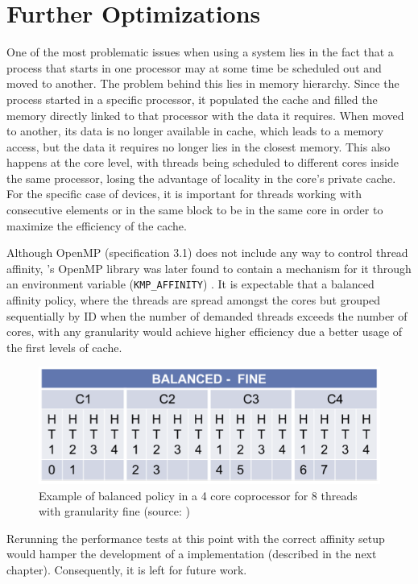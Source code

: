 \documentclass[../thesis]{subfiles}
\begin{document}
	\section{Further Optimizations}
	\label{sec:mic:further}

	One of the most problematic issues when using a \numa system lies in the fact that a process that starts in one processor may at some time be scheduled out and moved to another. The problem behind this lies in memory hierarchy. Since the process started in a specific processor, it populated the cache and filled the memory directly linked to that processor with the data it requires. When moved to another, its data is no longer available in cache, which leads to a memory access, but the data it requires no longer lies in the closest memory. This also happens at the core level, with threads being scheduled to different cores inside the same processor, losing the advantage of locality in the core's private cache. For the specific case of \intel\mic devices, it is important for threads working with consecutive elements or in the same block to be in the same core in order to maximize the efficiency of the cache.

	Although OpenMP (specification 3.1) does not include any way to control thread affinity, \intel's OpenMP library was later found to contain a mechanism for it through an environment variable (\texttt{KMP\_AFFINITY}) \cite{PRACE:MIC:BestPracticeGuide,CESGA:MIC:Evaluation}. It is expectable that a balanced affinity policy, where the threads are spread amongst the cores but grouped sequentially by ID when the number of demanded threads exceeds the number of cores, with any granularity would achieve higher efficiency due a better usage of the first levels of cache.

	\begin{figure}
		\begin{center}
			\includegraphics[width=\textwidth]{assets/images/kmp_affinity_balanced.png}
		\end{center}
		\caption{Example of balanced policy in a 4 core coprocessor for 8 threads with granularity fine (source: \cite{CESGA:MIC:Evaluation})}
		\label{fig:kmp_affinity:balanced}
	\end{figure}

	Rerunning the performance tests at this point with the correct affinity setup would hamper the development of a \cuda implementation (described in the next chapter). Consequently, it is left for future work.
\end{document}

